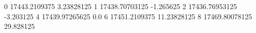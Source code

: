 0 17443.2109375 3.23828125
1 17438.70703125 -1.265625
2 17436.76953125 -3.203125
4 17439.97265625 0.0
6 17451.2109375 11.23828125
8 17469.80078125 29.828125
